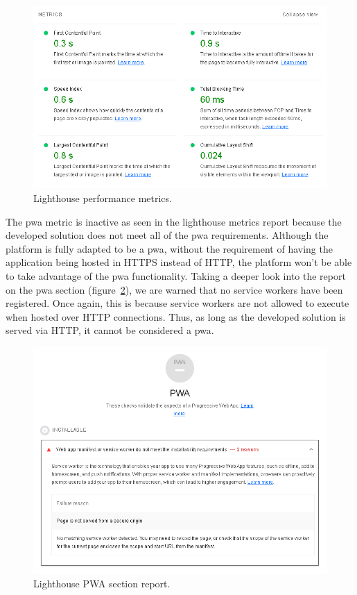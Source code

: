 \begin{figure}[H]
    \centering
    \includegraphics[scale=0.5]{Chapters/img/lighthouse/report-1-no-pwa-metrics.png}
    \caption{Lighthouse performance metrics.}
    \label{fig:lighthouse-pmetrics}
\end{figure}

The \acrshort{pwa} metric is inactive as seen in the lighthouse metrics report because the developed solution does not meet all of the \acrshort{pwa} requirements. Although the platform is fully adapted to be a \acrshort{pwa}, without the requirement of having the application being hosted in HTTPS instead of HTTP, the platform won't be able to take advantage of the \acrshort{pwa} functionality.
Taking a deeper look into the report on the \acrshort{pwa} section (figure~\ref{fig:lighthouse-pwa}), we are warned that no service workers have been registered. Once again, this is because service workers are not allowed to execute when hosted over HTTP connections. Thus, as long as the developed solution is served via HTTP, it cannot be considered a \acrshort{pwa}.

\begin{figure}[H]
    \centering
    \includegraphics[scale=0.5]{Chapters/img/lighthouse/report-1-rip-pwa.png}
    \caption{Lighthouse PWA section report.}
    \label{fig:lighthouse-pwa}
\end{figure}

